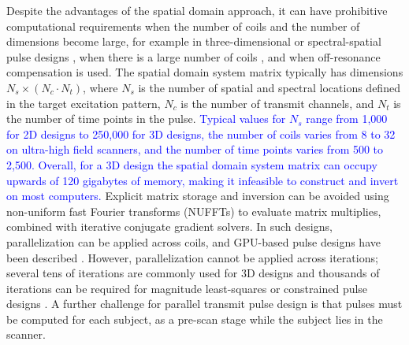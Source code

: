 \par Despite the advantages of the spatial domain approach, 
it can have prohibitive computational requirements when the number of coils and the number of dimensions become large, 
for example in three-dimensional \cite{malik2012tailored,davids2016fast} or spectral-spatial pulse designs \cite{stenger2000three,setsompop2009,Malik:2010aa,yang2010four}, 
when there is a large number of coils \cite{orzada:2019},
and when off-resonance compensation is used.  
The spatial domain system matrix typically has dimensions $N_s \times (N_c \cdot N_t)$, 
where $N_s$ is the number of spatial and spectral locations defined in the target excitation pattern,
$N_c$ is the number of transmit channels, and $N_t$ is the number of time points in the pulse.
\textcolor{blue}{Typical values for $N_s$ range from 1,000 for 2D designs to 250,000 for 3D designs,
the number of coils varies from 8 to 32 on ultra-high field scanners,
and the number of time points varies from 500 to 2,500. 
Overall, for a 3D design the spatial domain system matrix can occupy upwards of 120 gigabytes of memory,
making it infeasible to construct and invert on most computers.} 
Explicit matrix storage and inversion can be avoided using non-uniform fast Fourier transforms (NUFFTs) to evaluate matrix multiplies,
combined with iterative conjugate gradient solvers. 
In such designs, parallelization can be applied across coils, %
and GPU-based pulse designs have been described \cite{deng:2011}. 
However, parallelization cannot be applied across iterations;
several tens of iterations are commonly used for 3D designs and thousands of iterations can be required for 
magnitude least-squares \cite{setsompop2008magnitude} 
or constrained pulse designs \cite{brunner2010optimal,hoyos:tmi:2014}. 
A further challenge for parallel transmit pulse design is that pulses must be computed for each subject,
as a pre-scan stage while the subject lies in the scanner. 

